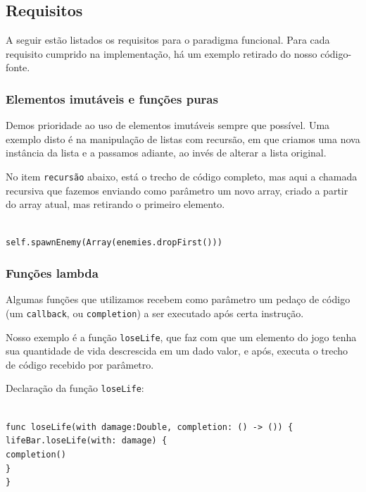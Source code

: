 \documentclass[rel_mlp]{iiufrgs}
\newcommand\tab[1][1cm]{\hspace*{#1}}
\begin{document}

\subsection{Requisitos}

A seguir estão listados os requisitos para o paradigma funcional. Para cada requisito cumprido na implementação, há um exemplo retirado do nosso código-fonte.


\subsubsection{Elementos imutáveis e funções puras}

Demos prioridade ao uso de elementos imutáveis sempre que possível. Uma exemplo disto é na manipulação de listas com recursão, em que criamos uma nova instância da lista e a passamos adiante, ao invés de alterar a lista original.

No item \texttt{recursão} abaixo, está o trecho de código completo, mas aqui a chamada recursiva que fazemos enviando como parâmetro um novo array, criado a partir do array atual, mas retirando o primeiro elemento.

\texttt{
\\self.spawnEnemy(Array(enemies.dropFirst()))
}


\subsubsection{Funções lambda}

Algumas funções que utilizamos recebem como parâmetro um pedaço de código (um \texttt{callback}, ou \texttt{completion}) a ser executado após certa instrução.

Nosso exemplo é a função \texttt{loseLife}, que faz com que um elemento do jogo tenha sua quantidade de vida descrescida em um dado valor, e após, executa o trecho de código recebido por parâmetro.

Declaração da função \texttt{loseLife}:

\texttt{
\\func loseLife(with damage:Double, completion: () -> ()) \{
\\\tab lifeBar.loseLife(with: damage) \{
\\\tab\tab completion()
\\\tab \}
\\\}
}
\end{document}
